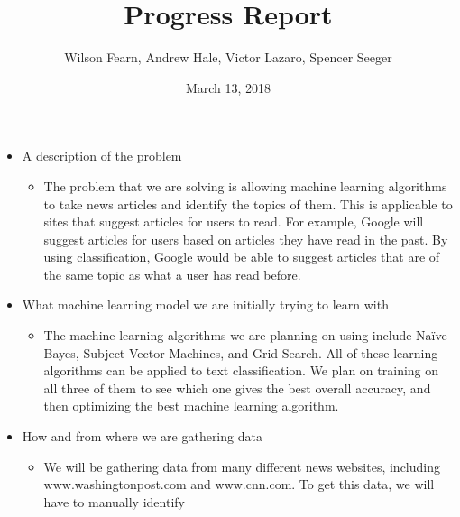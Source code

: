 \documentclass[fleqn,11pt]{article}
\begin{document}
  \lstset{
    language=Python,
    basicstyle=\small,          %
    keywordstyle=\bfseries,
    identifierstyle=,           %
    commentstyle=,              %
    stringstyle=\ttfamily,      %
    showstringspaces=false,     %
    numbers=left,
    numberstyle=\tiny,
    numbersep=5pt,
    frame=tb,
  }

  \title{Progress Report}
  \author{Wilson Fearn, Andrew Hale, Victor Lazaro, Spencer Seeger}
  \date{March 13, 2018}
  \maketitle

  \begin{itemize}
    \item A description of the problem
      \begin{itemize}
        \item The problem that we are solving is allowing machine learning algorithms to take news 
        articles and identify the topics of them. This is applicable to sites that suggest articles 
        for users to read. For example, Google will suggest articles for users based on articles 
        they have read in the past. By using classification, Google would be able to suggest 
        articles that are of the same topic as what a user has read before.
      \end{itemize}
    \item What machine learning model we are initially trying to learn with
      \begin{itemize}
        \item The machine learning algorithms we are planning on using include Na{\"i}ve Bayes, Subject 
        Vector Machines, and Grid Search. All of these learning algorithms can be applied to text 
        classification. We plan on training on all three of them to see which one gives the best overall 
        accuracy, and then optimizing the best machine learning algorithm.
      \end{itemize}
    \item How and from where we are gathering data
      \begin{itemize}
        \item We will be gathering data from many different news websites, including 
        www.washingtonpost.com and www.cnn.com. To get this data, we will have to manually identify 

\end{itemize}
\end{itemize}
\end{document}
